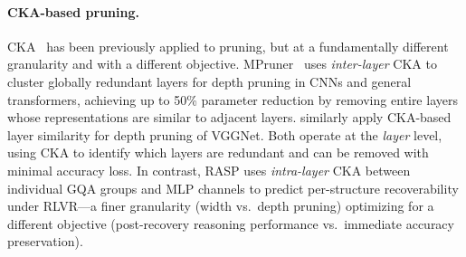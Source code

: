 \paragraph{CKA-based pruning.}
CKA~\citep{kornblith2019cka} has been previously applied to pruning, but at a fundamentally different granularity and with a different objective.
MPruner~\citep{mpruner2024} uses \emph{inter-layer} CKA to cluster globally redundant layers for depth pruning in CNNs and general transformers, achieving up to 50\% parameter reduction by removing entire layers whose representations are similar to adjacent layers.
\citet{lachance2024cka} similarly apply CKA-based layer similarity for depth pruning of VGGNet.
Both operate at the \emph{layer} level, using CKA to identify which layers are redundant and can be removed with minimal accuracy loss.
In contrast, RASP uses \emph{intra-layer} CKA between individual GQA groups and MLP channels to predict per-structure recoverability under RLVR---a finer granularity (width vs.\ depth pruning) optimizing for a different objective (post-recovery reasoning performance vs.\ immediate accuracy preservation).
